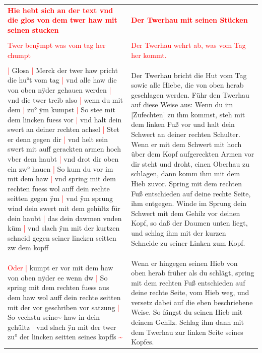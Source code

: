 \begin{longtable}{p{6.25cm}p{6.25cm}}
    \textbf{\textcolor{red}{
        Hie hebt sich an der text vnd die glos von dem twer haw mit seinen stucken}}
    &
    \textbf{\textcolor{red}{
        Der Twerhau mit seinen Stücken}}
    \\
    \\
    \textcolor{red}{
        Twer benÿmpt was vom tag her chumpt}
    &
    \textcolor{red}{
        Der Twerhau wehrt ab, was vom Tag her kommt.}
    \\
    \\
    \textcolor{red}{|} Glosa
    \textcolor{red}{|} Merck der twer haw pricht die hu°t vom tag
    \textcolor{red}{|} vnd alle haw die von oben nÿder gehauen werden
    \textcolor{red}{|} vnd die twer treib also
    \textcolor{red}{|} wenn du mit dem
    \textcolor{red}{|} zu° ÿm kumpst
    \textcolor{red}{|} So stee mit dem lincken fuess vor
    \textcolor{red}{|} vnd halt dein swert an deiner rechten achsel
    \textcolor{red}{|} Stet er denn gegen dir
    \textcolor{red}{|} vnd helt sein swert mit auff gerackten armen hoch vber dem haubt
    \textcolor{red}{|} vnd drot dir oben ein zw° hauen
    \textcolor{red}{|} So kum du vor im mit dem haw
    \textcolor{red}{|} vnd spring mit dem rechten fuess wol auff dein rechte seitten gegen ÿm
    \textcolor{red}{|} vnd ÿm sprung wind dein swert mit dem gehültz für dein haubt
    \textcolor{red}{|} das dein dawmen vnden küm
    \textcolor{red}{|} vnd slach ÿm mit der kurtzen schneid gegen seiner lincken seitten zw dem kopff
    &
    Der Twerhau bricht die Hut vom Tag sowie alle Hiebe, die von oben herab geschlagen werden.
    Führ den Twerhau auf diese Weise aus: Wenn du im [Zufechten] zu ihm kommst, steh mit dem linken Fuß vor und halt dein Schwert an deiner rechten Schulter.
    Wenn er mit dem Schwert mit hoch über dem Kopf aufgereckten Armen vor dir steht und droht, einen Oberhau zu schlagen, dann komm ihm mit dem Hieb zuvor.
    Spring mit dem rechten Fuß entschieden auf deine rechte Seite, ihm entgegen.
    Winde im Sprung dein Schwert mit dem Gehilz vor deinen Kopf, so daß der Daumen unten liegt, und schlag ihm mit der kurzen Schneide zu seiner Linken zum Kopf.
    \\
    \\
    \textcolor{red}{Oder}
    \textcolor{red}{|} kumpt er vor mit dem haw von oben nÿder ee wenn dw
    \textcolor{red}{|} So spring mit dem rechten fuess aus dem haw wol auff dein rechte seitten mit der vor geschriben vor satzung
    \textcolor{red}{|} So vechstu seine\textasciitilde{} haw in dein gehültz
    \textcolor{red}{|} vnd slach ÿn mit der twer zu° der lincken seitten seines kopffs \textcolor{red}{\textasciitilde{}}
    &
    Wenn er hingegen seinen Hieb von oben herab früher als du schlägt, spring mit dem rechten Fuß entschieden auf deine rechte Seite, vom Hieb weg, und versetz dabei auf die eben beschriebene Weise.
    So fängst du seinen Hieb mit deinem Gehilz.
    Schlag ihm dann mit dem Twerhau zur linken Seite seines Kopfes.
\end{longtable}

